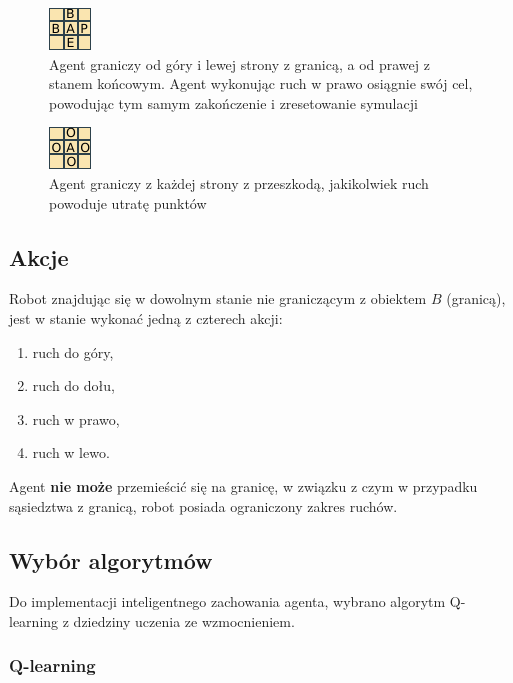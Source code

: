 \begin{figure}[H]
    \centering
    \includegraphics[scale=10]{grid3}
    \caption{Agent graniczy od góry i lewej strony z granicą, a od prawej z stanem końcowym. Agent wykonując 
ruch w prawo osiągnie swój cel, powodując tym samym zakończenie i zresetowanie symulacji}
    \label{fig:grid3}
\end{figure}

\begin{figure}[H]
    \centering
    \includegraphics[scale=10]{grid4}
    \caption{Agent graniczy z każdej strony z przeszkodą, jakikolwiek ruch powoduje utratę punktów}
    \label{fig:grid4}
\end{figure}

\subsection{Akcje}
\label{subsec:akcje}

Robot znajdując się w dowolnym stanie nie graniczącym z obiektem $B$ (granicą), jest w stanie wykonać jedną z czterech 
akcji:

\begin{enumerate}
 \item ruch do góry,
 \item ruch do dołu,
 \item ruch w prawo,
 \item ruch w lewo.
\end{enumerate}

Agent \textbf{nie może} przemieścić się na granicę, w związku z czym w przypadku sąsiedztwa z granicą, robot posiada 
ograniczony zakres ruchów. 

\subsection{Wybór algorytmów}
\label{subsec:wyboralgorytmow}

Do implementacji inteligentnego zachowania agenta, wybrano algorytm Q-learning z dziedziny uczenia ze wzmocnieniem.



\subsubsection{Q-learning}
\label{subsubsec:qlearning}

